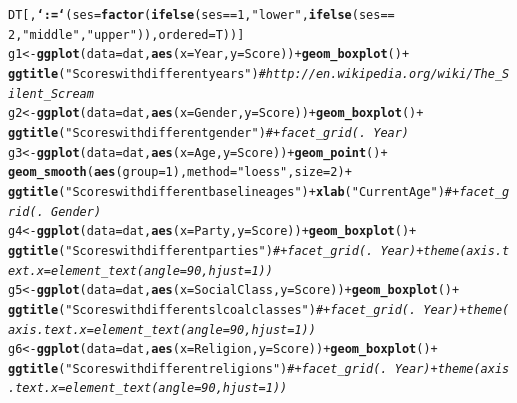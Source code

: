\documentclass[11pt,letter]{article}\usepackage[]{graphicx}\usepackage[]{color}
\makeatletter
\newcommand{\hlnum}[1]{\textcolor[rgb]{0.686,0.059,0.569}{#1}}%
\newcommand{\hlstr}[1]{\textcolor[rgb]{0.192,0.494,0.8}{#1}}%
\newcommand{\hlcom}[1]{\textcolor[rgb]{0.678,0.584,0.686}{\textit{#1}}}%
\newcommand{\hlopt}[1]{\textcolor[rgb]{0,0,0}{#1}}%
\newcommand{\hlstd}[1]{\textcolor[rgb]{0.345,0.345,0.345}{#1}}%
\newcommand{\hlkwb}[1]{\textcolor[rgb]{0.69,0.353,0.396}{#1}}%
\newcommand{\hlkwc}[1]{\textcolor[rgb]{0.333,0.667,0.333}{#1}}%
\newcommand{\hlkwd}[1]{\textcolor[rgb]{0.737,0.353,0.396}{\textbf{#1}}}%
\newenvironment{kframe}{%
 \def\at@end@of@kframe{}%
 \ifinner\ifhmode%
  \def\at@end@of@kframe{\end{minipage}}%
  \begin{minipage}{\columnwidth}%
 \fi\fi%
 \def\FrameCommand##1{\hskip\@totalleftmargin \hskip-\fboxsep
 \colorbox{shadecolor}{##1}\hskip-\fboxsep
     \hskip-\linewidth \hskip-\@totalleftmargin \hskip\columnwidth}%
 \MakeFramed {\advance\hsize-\width
   \@totalleftmargin\z@ \linewidth\hsize
   \@setminipage}}%
 {\par\unskip\endMakeFramed%
 \at@end@of@kframe}
\newenvironment{knitrout}{}{} %
\makeatother
\begin{document}
\begin{knitrout}
\begin{kframe}
\begin{alltt}
\hlstd{DT[,} \hlkwd{`:=`}\hlstd{(}\hlkwc{ses} \hlstd{=} \hlkwd{factor}\hlstd{(}\hlkwd{ifelse}\hlstd{(ses} \hlopt{==} \hlnum{1}\hlstd{,} \hlstr{"lower"}\hlstd{,} \hlkwd{ifelse}\hlstd{(ses} \hlopt{==}
    \hlnum{2}\hlstd{,} \hlstr{"middle"}\hlstd{,} \hlstr{"upper"}\hlstd{)),} \hlkwc{ordered} \hlstd{= T))]}
\hlstd{g1} \hlkwb{<-} \hlkwd{ggplot}\hlstd{(}\hlkwc{data} \hlstd{= dat,} \hlkwd{aes}\hlstd{(}\hlkwc{x} \hlstd{= Year,} \hlkwc{y} \hlstd{= Score))} \hlopt{+} \hlkwd{geom_boxplot}\hlstd{()} \hlopt{+}
    \hlkwd{ggtitle}\hlstd{(}\hlstr{"Scores with different years"}\hlstd{)}  \hlcom{# http://en.wikipedia.org/wiki/The_Silent_Scream}
\hlstd{g2} \hlkwb{<-} \hlkwd{ggplot}\hlstd{(}\hlkwc{data} \hlstd{= dat,} \hlkwd{aes}\hlstd{(}\hlkwc{x} \hlstd{= Gender,} \hlkwc{y} \hlstd{= Score))} \hlopt{+} \hlkwd{geom_boxplot}\hlstd{()} \hlopt{+}
    \hlkwd{ggtitle}\hlstd{(}\hlstr{"Scores with different gender"}\hlstd{)}  \hlcom{# + facet_grid(. ~ Year) }
\hlstd{g3} \hlkwb{<-} \hlkwd{ggplot}\hlstd{(}\hlkwc{data} \hlstd{= dat,} \hlkwd{aes}\hlstd{(}\hlkwc{x} \hlstd{= Age,} \hlkwc{y} \hlstd{= Score))} \hlopt{+} \hlkwd{geom_point}\hlstd{()} \hlopt{+}
    \hlkwd{geom_smooth}\hlstd{(}\hlkwd{aes}\hlstd{(}\hlkwc{group} \hlstd{=} \hlnum{1}\hlstd{),} \hlkwc{method} \hlstd{=} \hlstr{"loess"}\hlstd{,} \hlkwc{size} \hlstd{=} \hlnum{2}\hlstd{)} \hlopt{+}
    \hlkwd{ggtitle}\hlstd{(}\hlstr{"Scores with different baseline ages"}\hlstd{)} \hlopt{+} \hlkwd{xlab}\hlstd{(}\hlstr{"Current Age"}\hlstd{)}  \hlcom{#  + facet_grid(. ~ Gender)}
\hlstd{g4} \hlkwb{<-} \hlkwd{ggplot}\hlstd{(}\hlkwc{data} \hlstd{= dat,} \hlkwd{aes}\hlstd{(}\hlkwc{x} \hlstd{= Party,} \hlkwc{y} \hlstd{= Score))} \hlopt{+} \hlkwd{geom_boxplot}\hlstd{()} \hlopt{+}
    \hlkwd{ggtitle}\hlstd{(}\hlstr{"Scores with different parties"}\hlstd{)}  \hlcom{# + facet_grid(. ~ Year)  + theme(axis.text.x = element_text(angle = 90, hjust = 1)) }
\hlstd{g5} \hlkwb{<-} \hlkwd{ggplot}\hlstd{(}\hlkwc{data} \hlstd{= dat,} \hlkwd{aes}\hlstd{(}\hlkwc{x} \hlstd{= SocialClass,} \hlkwc{y} \hlstd{= Score))} \hlopt{+} \hlkwd{geom_boxplot}\hlstd{()} \hlopt{+}
    \hlkwd{ggtitle}\hlstd{(}\hlstr{"Scores with different slcoal classes"}\hlstd{)}  \hlcom{# + facet_grid(. ~ Year) + theme(axis.text.x = element_text(angle = 90, hjust = 1)) }
\hlstd{g6} \hlkwb{<-} \hlkwd{ggplot}\hlstd{(}\hlkwc{data} \hlstd{= dat,} \hlkwd{aes}\hlstd{(}\hlkwc{x} \hlstd{= Religion,} \hlkwc{y} \hlstd{= Score))} \hlopt{+} \hlkwd{geom_boxplot}\hlstd{()} \hlopt{+}
    \hlkwd{ggtitle}\hlstd{(}\hlstr{"Scores with different religions"}\hlstd{)}  \hlcom{# + facet_grid(. ~ Year) + theme(axis.text.x = element_text(angle = 90, hjust = 1)) }

\end{alltt}
\end{kframe}
\end{knitrout}
\end{document}
